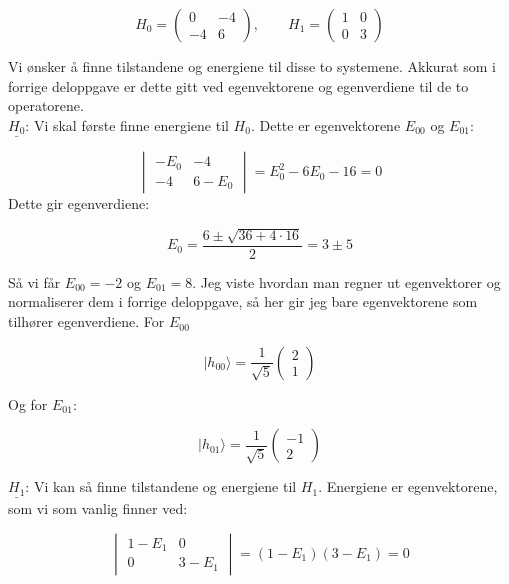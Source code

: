 \documentclass[a4paper,norsk, 10pt]{article}
\numberwithin{equation}{section}
\begin{document}
$$
H_0 = 
\begin{pmatrix}
0 & -4\\
-4 & 6
\end{pmatrix}
, \qquad
H_1 = 
\begin{pmatrix}
1 & 0\\
0 & 3
\end{pmatrix}
$$

Vi ønsker å finne tilstandene og energiene til disse to systemene. Akkurat som i forrige deloppgave er dette gitt ved egenvektorene og egenverdiene til de to operatorene. \\

\textbf{$\underline{H_0}$}: Vi skal første finne energiene til $H_0$. Dette er egenvektorene $E_{00}$ og $E_{01}$:

$$
\begin{vmatrix}
-E_0 & -4\\
-4 & 6-E_0
\end{vmatrix}
= E_0^2 -6E_0 - 16 = 0
$$
Dette gir egenverdiene:

$$
E_0 = \frac{6 \pm \sqrt{36 + 4\cdot 16}}{2} = 3\pm 5
$$

Så vi får $E_{00} = -2$ og $E_{01} = 8$. Jeg viste hvordan man regner ut egenvektorer og normaliserer dem i forrige deloppgave, så her gir jeg bare egenvektorene som tilhører egenverdiene. For $E_{00}$

\begin{equation}
|h_{00}\rangle = \frac{1}{\sqrt{5}}
\begin{pmatrix}
2\\ 1
\end{pmatrix}
\label{eq:h00}
\end{equation}

Og for $E_{01}$:

\begin{equation}
|h_{01}\rangle = \frac{1}{\sqrt{5}}
\begin{pmatrix}
-1\\ 2
\end{pmatrix}
\label{eq:h01}
\end{equation}

\textbf{$\underline{H_1}$}: Vi kan så finne tilstandene og energiene til $H_1$. Energiene er egenvektorene, som vi som vanlig finner ved:

$$
\begin{vmatrix}
1-E_1 & 0\\
0 & 3-E_1
\end{vmatrix}
= (1-E_1)(3-E_1) = 0
$$
\end{document}
